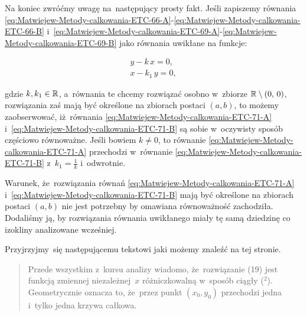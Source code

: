\documentclass[a4paper,11pt]{article}
\numberwithin{equation}{section}
\begin{document}
Na koniec zwróćmy uwagę na~następujący prosty fakt. Jeśli zapiszemy równania
\eqref{eq:Matwiejew-Metody-calkowania-ETC-66-A}-\eqref{eq:Matwiejew-Metody-calkowania-ETC-66-B}
i~\eqref{eq:Matwiejew-Metody-calkowania-ETC-69-A}-\eqref{eq:Matwiejew-Metody-calkowania-ETC-69-B} jako równania uwikłane na funkcje:

\negVerSpaceFour


\begin{subequations}

  \begin{align}
    \label{eq:Matwiejew-Metody-calkowania-ETC-71-A}
    y - k \, x = 0, \\
    \label{eq:Matwiejew-Metody-calkowania-ETC-71-B}
    x - k_{ 1 } \, y = 0,
  \end{align}

\end{subequations}


\noindent
gdzie $k, k_{ 1 } \in \mathbb{R}$, a~równania te chcemy rozwiązać osobno w~zbiorze
$\mathbb{R} \setminus ( 0, \, 0 )$, rozwiązania zaś mają być określone na zbiorach postaci
$( a, b )$, to możemy zaobserwować, iż~równania
\eqref{eq:Matwiejew-Metody-calkowania-ETC-71-A}
i~\eqref{eq:Matwiejew-Metody-calkowania-ETC-71-B} są sobie w~oczywisty
sposób częściowo równoważne. Jeśli bowiem $k \neq 0$, to równanie
\eqref{eq:Matwiejew-Metody-calkowania-ETC-71-A} przechodzi w~równanie
\eqref{eq:Matwiejew-Metody-calkowania-ETC-71-B}
z~$k_{ 1 } = \frac{ 1 }{ k }$ i~odwrotnie.

Warunek, że~rozwiązania równań
\eqref{eq:Matwiejew-Metody-calkowania-ETC-71-A}
i~\eqref{eq:Matwiejew-Metody-calkowania-ETC-71-B} mają być określone na
zbiorach postaci $( a, b )$ nie jest potrzebny by omawiana równoważność
zachodziła. Dodaliśmy ją, by rozwiązania równania uwikłanego miały tę samą
dziedzinę co izokliny analizowane wcześniej.

\VerSpaceFour





\noindent
{} Przyjrzyjmy~się następującemu tekstowi jaki możemy znaleźć na tej
stronie.





\begin{quote}

  Przede wszystkim z~kursu analizy wiadomo, że~rozwiązanie (19) jest funkcją
  zmiennej niezależnej~$x$ różniczkowalną w~sposób ciągły (${}^{ 2 }$).
  Geometrycznie oznacza to, że~przez punkt $( x_{ 0 }, y_{ 0 } )$ przechodzi
  jedna i~tylko jedna krzywa całkowa.

\end{quote}
\end{document}
